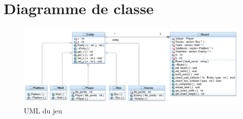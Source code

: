 \section{Diagramme de classe}

\begin{figure}[h]
	\centering
	\includegraphics[width=\textwidth] {Sokoban_Modele.png}
	\caption{UML du jeu}
	\label{fig:UML_du_jeu}
\end{figure}
